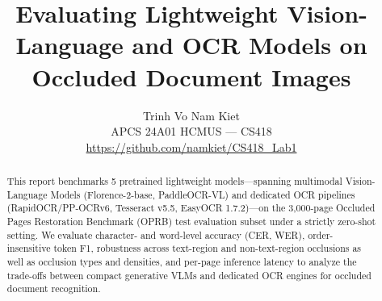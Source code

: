 \documentclass[10pt,a4paper]{article}
\title{\textbf{Evaluating Lightweight Vision-Language and OCR Models on Occluded Document Images}}
\author{
    Trinh Vo Nam Kiet \quad 24125013 \\
    APCS 24A01 HCMUS --- CS418 \\
    \small\url{https://github.com/namkiet/CS418_Lab1}
}
\date{}
\begin{document}
\maketitle

\begin{abstract}
This report benchmarks 5 pretrained lightweight models---spanning multimodal Vision-Language Models (Florence-2-base, PaddleOCR-VL) and dedicated OCR pipelines (RapidOCR/PP-OCRv6, Tesseract v5.5, EasyOCR 1.7.2)---on the 3,000-page Occluded Pages Restoration Benchmark (OPRB) test evaluation subset under a strictly zero-shot setting. We evaluate character- and word-level accuracy (CER, WER), order-insensitive token F1, robustness across text-region and non-text-region occlusions as well as occlusion types and densities, and per-page inference latency to analyze the trade-offs between compact generative VLMs and dedicated OCR engines for occluded document recognition.
\end{abstract}






\end{document}
